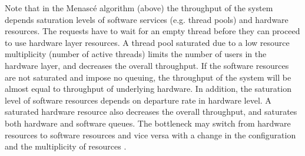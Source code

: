  Note that in the Menasc{\'e} algorithm (above) the throughput of the system depends saturation levels of software services (e.g. thread pools) and hardware resources. The requests have to wait for an empty thread before they can proceed to use hardware layer resources. A thread pool saturated due to a low resource multiplicity (number of active threads) limits the number of users in the hardware layer, and decreases the overall throughput. If the software resources are not saturated and impose no queuing, the throughput of the system will be almost equal to throughput of underlying hardware. 
  In addition, the saturation level of software resources depends on departure rate in hardware level. A saturated hardware resource also decreases the overall throughput, and saturates both hardware and software queues. 
  The bottleneck may switch from hardware resources to software resources and vice versa with a change in the configuration and the multiplicity of resources \cite{Opera,cornel_barna_model-based_2011}.  

